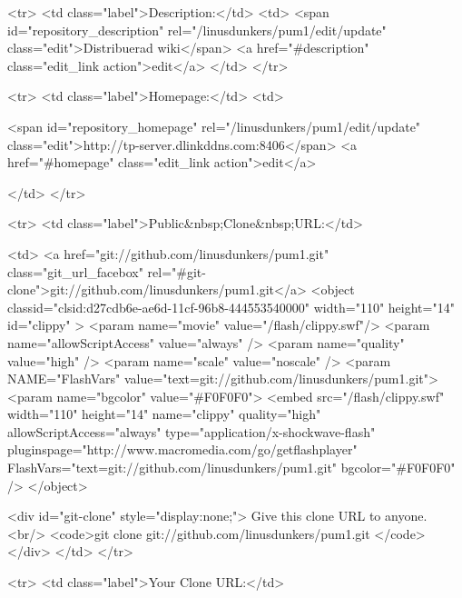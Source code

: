         
          <tr>
            <td class="label">Description:</td>
            <td>
              <span id="repository_description" rel="/linusdunkers/pum1/edit/update" class="edit">Distribuerad wiki</span>
              <a href="#description" class="edit_link action">edit</a>
            </td>
          </tr>
        

        
          
            <tr>
              <td class="label">Homepage:</td>
              <td>
                
                  <span id="repository_homepage" rel="/linusdunkers/pum1/edit/update" class="edit">http://tp-server.dlinkddns.com:8406</span>
                  <a href="#homepage" class="edit_link action">edit</a>
                
              </td>
            </tr>
          

          
            <tr>
              <td class="label">Public&nbsp;Clone&nbsp;URL:</td>
              
              <td>
                <a href="git://github.com/linusdunkers/pum1.git" class="git_url_facebox" rel="#git-clone">git://github.com/linusdunkers/pum1.git</a>
                      <object classid="clsid:d27cdb6e-ae6d-11cf-96b8-444553540000"
              width="110"
              height="14"
              id="clippy" >
      <param name="movie" value="/flash/clippy.swf"/>
      <param name="allowScriptAccess" value="always" />
      <param name="quality" value="high" />
      <param name="scale" value="noscale" />
      <param NAME="FlashVars" value="text=git://github.com/linusdunkers/pum1.git">
      <param name="bgcolor" value="#F0F0F0">
      <embed src="/flash/clippy.swf"
             width="110"
             height="14"
             name="clippy"
             quality="high"
             allowScriptAccess="always"
             type="application/x-shockwave-flash"
             pluginspage="http://www.macromedia.com/go/getflashplayer"
             FlashVars="text=git://github.com/linusdunkers/pum1.git"
             bgcolor="#F0F0F0"
      />
      </object>

                <div id="git-clone" style="display:none;">
                  Give this clone URL to anyone.
                  <br/>
                  <code>git clone git://github.com/linusdunkers/pum1.git </code>
                </div>
              </td>
            </tr>
          
          
          <tr>
            <td class="label">Your Clone URL:</td>
            
